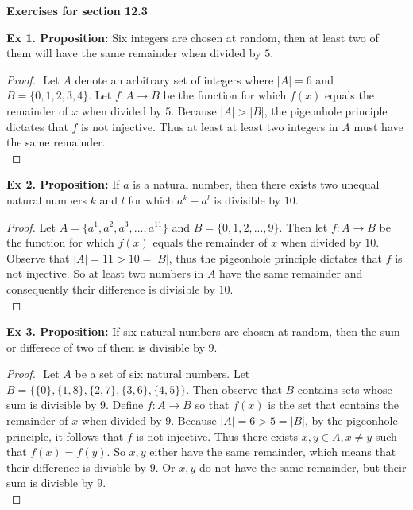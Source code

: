 \documentclass{article}
\date{}
\author{}
\begin{document}
\centerline{\textbf{Exercises for section 12.3}}

\textbf{Ex 1. Proposition:} Six integers are chosen at random, then at least two of them will have the same remainder when divided by $5$.
\begin{proof}
$ $\newline
Let $A$ denote an arbitrary set of integers where $|A|=6$ and $B=\{0,1,2,3,4\}$. Let $f: A \rightarrow B$ be the function for which $f(x)$ equals the remainder of $x$ when divided by $5$. Because $|A| > |B|$, the pigeonhole principle dictates that $f$ is not injective. Thus at least at least two integers in $A$ must have the same remainder.\\
\end{proof}

\textbf{Ex 2. Proposition:} If $a$ is a natural number, then there exists two unequal natural numbers $k$ and $l$ for which $a^k-a^l$ is divisible by $10$.
\begin{proof}
Let $A=\{a^1, a^2, a^3, ..., a^{11}\}$ and $B=\{0,1,2,...,9\}$. Then let $f: A \rightarrow B$ be the function for which $f(x)$ equals the remainder of $x$ when divided by $10$. Observe that $|A|=11 > 10 = |B|$, thus the pigeonhole principle dictates that $f$ is not injective. So at least two numbers in $A$ have the same remainder and consequently their difference is divisible by $10$.\\
\end{proof}

\textbf{Ex 3. Proposition:} If six natural numbers are chosen at random, then the sum or differece of two of them is divisible by $9$.
\begin{proof}
$ $\newline
Let $A$ be a set of six natural numbers. Let $B=\{\{0\}, \{1,8\}, \{2,7\}, \{3,6\}, \{4,5\}\}$. Then observe that $B$ contains sets whose sum is divisible by $9$. Define $f: A \rightarrow B$ so that $f(x)$ is the set that contains the remainder of $x$ when divided by $9$. Because $|A| = 6 > 5 = |B|$, by the pigeonhole principle, it follows that $f$ is not injective. Thus there exists $x, y \in A, x \neq y$ such that $f(x)=f(y)$. So $x, y$ either have the same remainder, which means that their difference is divisble by $9$. Or $x, y$ do not have the same remainder, but their sum is divisble by $9$.\\
\end{proof}
\end{document}
